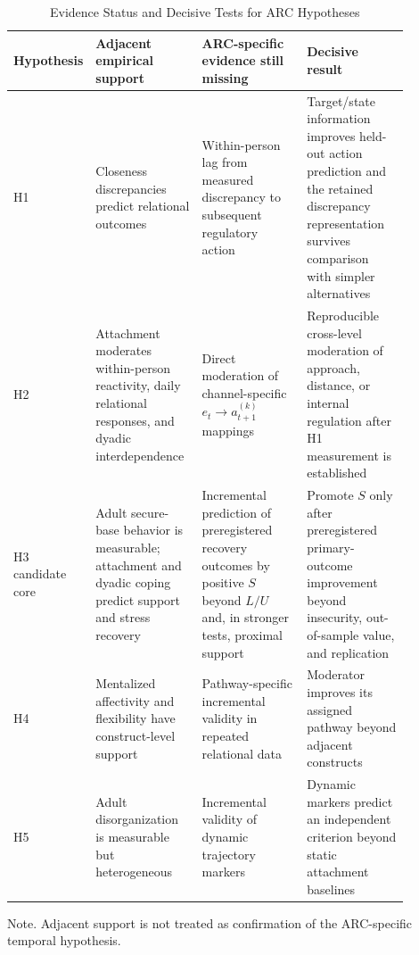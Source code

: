 \begin{table}[htbp]
\caption{Evidence Status and Decisive Tests for ARC Hypotheses}
\label{tab:hypothesis-evidence}
\centering
\scriptsize
\setlength{\tabcolsep}{2pt}
\renewcommand{\arraystretch}{0.85}
\begin{threeparttable}
\begin{tabular}{p{0.08\linewidth}p{0.27\linewidth}p{0.27\linewidth}p{0.26\linewidth}}
\toprule
Hypothesis & Adjacent empirical support & ARC-specific evidence still missing & Decisive result \\
\midrule
H1 & Closeness discrepancies predict relational outcomes \parencite{frost2013closeness,pusch2022closeness,pietras2024closeness} & Within-person lag from measured discrepancy to subsequent regulatory action & Target/state information improves held-out action prediction and the retained discrepancy representation survives comparison with simpler alternatives \\
H2 & Attachment moderates within-person reactivity, daily relational responses, and dyadic interdependence \parencite{sadikaj2011dynamics,segal2016responsiveness,xie2025interdependence,carnelley2025phubbing} & Direct moderation of channel-specific \(e_t\rightarrow a^{(k)}_{t+1}\) mappings & Reproducible cross-level moderation of approach, distance, or internal regulation after H1 measurement is established \\
H3 candidate core & Adult secure-base behavior is measurable; attachment and dyadic coping predict support and stress recovery \parencite{crowell2002securebase,davila2009securebase,powers2006cortisol,meuwly2012cortisol,salvatore2011recovery} & Incremental prediction of preregistered recovery outcomes by positive \(S\) beyond \(L/U\) and, in stronger tests, proximal support & Promote \(S\) only after preregistered primary-outcome improvement beyond insecurity, out-of-sample value, and replication \\
H4 & Mentalized affectivity and flexibility have construct-level support \parencite{greenberg2017mentalized,mosannenzadeh2024flexibility} & Pathway-specific incremental validity in repeated relational data & Moderator improves its assigned pathway beyond adjacent constructs \\
H5 & Adult disorganization is measurable but heterogeneous \parencite{pollard2023disorganized} & Incremental validity of dynamic trajectory markers & Dynamic markers predict an independent criterion beyond static attachment baselines \\
\bottomrule
\end{tabular}
\begin{tablenotes}[flushleft]
\footnotesize
\item Note. Adjacent support is not treated as confirmation of the ARC-specific temporal hypothesis.
\end{tablenotes}
\end{threeparttable}
\end{table}
